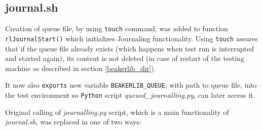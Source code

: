 \subsection{journal.sh}
Creation of  queue file, by using \texttt{touch} command, was added to function \texttt{rlJournalStart()} which initializes Journaling functionality. Using \texttt{touch} assures that if the queue file already exists (which happens when test run is interrupted and started again), its content is not deleted (in case of restart of the testing machine as described in section \ref{beakerlib_dir}).

It now also \texttt{exports} new variable \texttt{BEAKERLIB\_QUEUE}, with path to queue file, into the test environment so \texttt{Python} script \textit{queued\_journalling.py}, can later access it.

Original calling of \textit{journalling.py} script, which is a main functionality of \textit{journal.sh}, was replaced in one of two ways:

